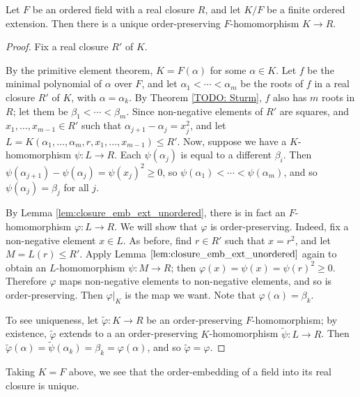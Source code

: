 \begin{lemma}
  \label{lem:closure_emb_ext}
  Let $F$ be an ordered field with a real closure $R$, and let $K/F$ be a finite ordered extension. Then there is a unique order-preserving $F$-homomorphism $K\to R$.
\end{lemma}
\begin{proof}
  Fix a real closure $R'$ of $K$.
  
  By the primitive element theorem, $K=F(\alpha)$ for some $\alpha\in K$. Let $f$ be the minimal polynomial of $\alpha$ over $F$, and let $\alpha_1<\cdots<\alpha_m$ be the roots of $f$ in a real closure $R'$ of $K$, with $\alpha=\alpha_k$. By Theorem \ref{TODO: Sturm}, $f$ also has $m$ roots in $R$; let them be $\beta_1<\cdots<\beta_m$. Since non-negative elements of $R'$ are squares, and $x_1,\dots,x_{m-1}\in R'$ such that $\alpha_{j+1}-\alpha_j=x_j^2$, and let $L=K(\alpha_1,\dots,\alpha_m,r,x_1,\dots,x_{m-1})\leq R'$. Now, suppose we have a $K$-homomorphism $\psi:L\to R$. Each $\psi(\alpha_j)$ is equal to a different $\beta_i$. Then $\psi(\alpha_{j+1})-\psi(\alpha_j)=\psi(x_j)^2\geq0$, so $\psi(\alpha_1)<\cdots<\psi(\alpha_m)$, and so $\psi(\alpha_j)=\beta_j$ for all $j$.

  By Lemma \ref{lem:closure_emb_ext_unordered}, there is in fact an $F$-homomorphism $\varphi:L\to R$. We will show that $\varphi$ is order-preserving. Indeed, fix a non-negative element $x\in L$. As before, find $r\in R'$ such that $x=r^2$, and let $M=L(r)\leq R'$. Apply Lemma $\ref{lem:closure_emb_ext_unordered}$ again to obtain an $L$-homomorphism $\psi:M\to R$; then $\varphi(x)=\psi(x)=\psi(r)^2\geq0$. Therefore $\varphi$ maps non-negative elements to non-negative elements, and so is order-preserving. Then $\varphi|_K$ is the map we want. Note that $\varphi(\alpha)=\beta_k$.

  To see uniqueness, let $\tilde\varphi:K\to R$ be an order-preserving $F$-homomorphism; by existence, $\tilde\varphi$ extends to a an order-preserving $K$-homomorphism $\tilde\psi:L\to R$. Then $\tilde\varphi(\alpha)=\tilde\psi(\alpha_k)=\beta_k=\varphi(\alpha)$, and so $\tilde\varphi=\varphi$.
\end{proof}

Taking $K=F$ above, we see that the order-embedding of a field into its real closure is unique.

